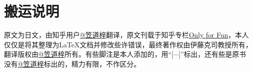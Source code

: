 \section*{搬运说明}

原文为日文，由知乎用户\href{https://www.zhihu.com/people/wo-bei-56}{@笠道梓}翻译，原文刊载于知乎专栏\href{https://www.zhihu.com/column/c_1245739225699885056}{Only for Fun}，本人仅仅是将其整理为\LaTeX 文档并修改些许错误，最终著作权由伊藤克司教授所有，翻译版权由\href{https://www.zhihu.com/people/wo-bei-56}{@笠道梓}所有。有些脚注是本人添加的，用“[$\cdots$]”标出，还有些是原书没有\href{https://www.zhihu.com/people/wo-bei-56}{@笠道梓}标出的，精力有限，不作区分。
